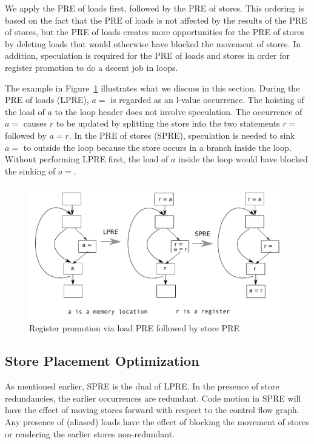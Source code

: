 We apply the PRE of loads
first, followed by the PRE of stores.  This ordering is based on the fact that
the PRE of loads is not affected by the results of the PRE of stores, but the
PRE of loads creates more opportunities for the PRE of stores by deleting
loads that would otherwise have blocked the movement of stores.  In addition,
speculation is required for the PRE of loads and stores in order for register
promotion to do a decent job in loops.  

The example in Figure~\ref{fig: promotion-example} illustrates what we discuss
in this section.  During the PRE of loads (LPRE), $a =$ is regarded as an
l-value occurrence.  The hoisting of the load of $a$ to the loop header does
not involve speculation. The occurrence of $a =$ causes $r$ to be updated
by splitting the store into the two statements $r =$ followed by $a = r$.  In 
the PRE of stores (SPRE), speculation is needed to sink $a =$ to outside the
loop because the store occurs in a branch inside the loop.  Without performing 
LPRE first, the load of $a$ inside the loop would
have blocked the sinking of $a =$.

\begin{figure}
\centering
\includegraphics[scale=0.55]{fig-promotion-example.pdf}
\caption{Register promotion via load PRE followed by store PRE}
\label{fig: promotion-example}
\end{figure}

\subsection{Store Placement Optimization}

As mentioned earlier, SPRE is the dual of LPRE.
In the presence of store redundancies, the earlier occurrences are redundant.
Code motion in SPRE will have the effect of moving stores forward with respect 
to the control flow graph.  Any presence of (aliased) loads have the effect of
blocking the movement of stores or rendering the earlier stores non-redundant.

